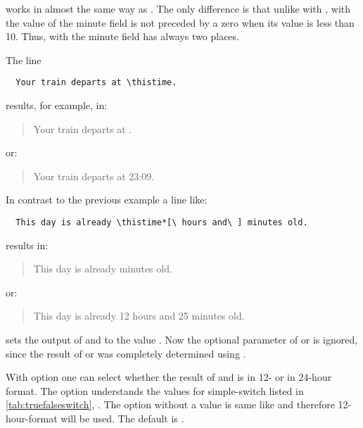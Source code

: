  works in almost the same way as .
The only difference is that unlike with , with
 the value of the minute field is not preceded by a
zero when its value is less than 10. Thus, with  the
minute field has always two places.
\begin{Example}
  The line
\begin{lstlisting}
  Your train departs at \thistime.
\end{lstlisting}
  results, for example, in:
  \begin{quote}
    Your train departs at \thistime.
  \end{quote}
  or:
  \begin{quote}
    Your train departs at 23:09.
  \end{quote}
  \bigskip
  In contrast to the previous example a line like:
\begin{lstlisting}
  This day is already \thistime*[\ hours and\ ] minutes old.
\end{lstlisting}
  results in:
  \begin{quote}
    This day is already  minutes old.
  \end{quote}
  or:
  \begin{quote}
    This day is already 12 hours and 25 minutes old.
  \end{quote}
\end{Example}
\EndIndexGroup


\begin{Declaration}%
\end{Declaration}%
 sets the output of  and
 to the value .  Now the optional
parameter of  or  is ignored, since
the result of  or  was completely
determined using .%
\EndIndexGroup


\begin{Declaration}
\end{Declaration}%
%
With option  one can select
whether the result of  and  is in 12- or in
24-hour format. The option understands the values for simple-switch listed in
\autoref{tab:truefalseswitch}, . The option
without a value is same like  and therefore
12-hour-format will be used. The default is .

